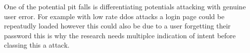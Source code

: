 
One of the potential pit falls is differentiating potentials attacking with genuine user error. For example with low rate ddos attacks a login page could be repeatudly loaded however this could also be due to a user forgetting their password this is why the research needs multiplce indication of intent before classing this a attack.  